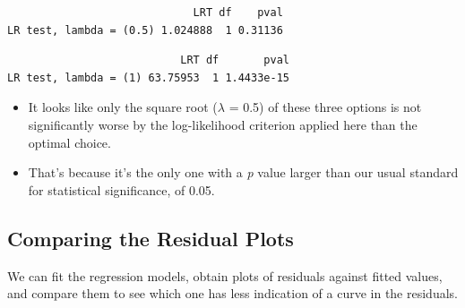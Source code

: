\documentclass[
]{book}
\newenvironment{Shaded}{\begin{snugshade}}{\end{snugshade}}
\newcommand{\DecValTok}[1]{\textcolor[rgb]{0.00,0.00,0.81}{#1}}
\newcommand{\KeywordTok}[1]{\textcolor[rgb]{0.13,0.29,0.53}{\textbf{#1}}}
\newcommand{\NormalTok}[1]{#1}
\newcommand{\OperatorTok}[1]{\textcolor[rgb]{0.81,0.36,0.00}{\textbf{#1}}}
\newcommand{\StringTok}[1]{\textcolor[rgb]{0.31,0.60,0.02}{#1}}
\providecommand{\tightlist}{%
  \setlength{\itemsep}{0pt}\setlength{\parskip}{0pt}}
\begin{document}
\begin{verbatim}
                             LRT df    pval
LR test, lambda = (0.5) 1.024888  1 0.31136
\end{verbatim}

\begin{Shaded}
\end{Shaded}

\begin{verbatim}
                           LRT df       pval
LR test, lambda = (1) 63.75953  1 1.4433e-15
\end{verbatim}

\begin{itemize}
\tightlist
\item
  It looks like only the square root (\(\lambda\) = 0.5) of these three options is not significantly worse by the log-likelihood criterion applied here than the optimal choice.
\item
  That's because it's the only one with a \emph{p} value larger than our usual standard for statistical significance, of 0.05.
\end{itemize}

\hypertarget{comparing-the-residual-plots}{%
\subsection{Comparing the Residual Plots}\label{comparing-the-residual-plots}}

We can fit the regression models, obtain plots of residuals against fitted values, and compare them to see which one has less indication of a curve in the residuals.
\end{document}
